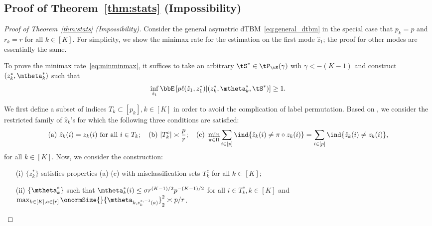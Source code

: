 \documentclass[lettersize,onecolumn,journal]{IEEEtran}
\theoremstyle{definition}
\theoremstyle{definition}
\begin{document}

\subsection{Proof of Theorem~\ref{thm:stats} (Impossibility)}\label{sec:statprove1}
{
\color{blue}

\begin{proof}[Proof of Theorem~\ref{thm:stats} (Impossibility)]Consider the general asymetric dTBM~\eqref{eq:general_dtbm} in the special case that $p_k = p$ and $r_k = r$ for all $ k\in [K]$. For simplicity, we show the minimax rate for the estimation on the first mode $\hat z_1$; the proof for other modes are essentially the same. 
   
   To prove the minimax rate~\eqref{eq:minminmax}, it suffices to take an arbitrary $\tS^* \in  \tP_{\tS}(\gamma)$ wih $\gamma < -(K-1)$ and construct $(z^*_k, \mtheta^*_k)$ such that 
   \begin{equation}
       \inf_{\hat z_1} \bbE \left[ p\ell(\hat z_1, z_1^*) | (z^*_k, \mtheta^*_k, \tS^*)  \right]\geq 1.
   \end{equation}
   
   We first define a subset of indices $T_k \subset [p_k], k \in [K]$ in order to avoid the complication of label permutation. Based on \citet[Proof of Theorem 6]{han2020exact}, we consider the restricted family of $\hat z_k$'s for which the following three conditions are satisfied:
\begin{equation}
    \text{(a)}\ \hat z_k(i)=z_k(i) \text{ for all }i\in T_k; \quad \text{(b)} \ |T^c_k|\asymp {p\over r}; \quad \text{(c)}\ \min_{\pi\in \Pi}\sum_{i\in[p]}\ind\{\hat z_k(i) \neq \pi\circ z_k (i)\} = \sum_{i\in[p]}\ind\{\hat z_k(i) \neq  z_k (i)\},
\end{equation} 
for all $k \in [K]$.
   Now, we consider the construction:
   \begin{enumerate}
       \item[(i)] $\{z_k^*\}$ satisfies properties (a)-(c) with misclassification sets $T_k^c$ for all $k \in [K]$;
       \item [(ii)] $\{\mtheta_k^*\}$ such that $\mtheta_k^*(i) \leq \sigma r^{(K-1)/2} p^{-(K-1)/2}$ for all $i \in T_k^c, k \in [K]$ and $\max_{k \in [K], a \in [r]} \onormSize{}{\mtheta_{k, z^{*, -1}_k(a)}}^2_2 \asymp p/r$.
   \end{enumerate}
   

\end{proof}}
\end{document}
